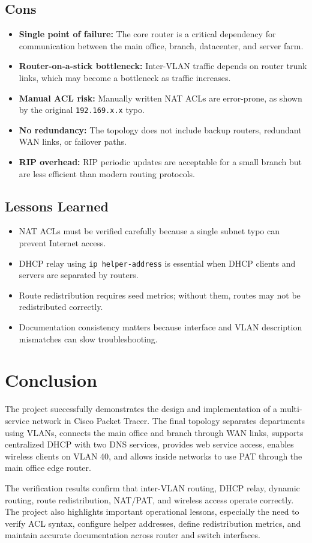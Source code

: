 \documentclass[12pt,a4paper]{article}
\begin{document}
\subsection*{Cons}
\begin{itemize}
    \item \textbf{Single point of failure:} The core router is a critical dependency for communication between the main office, branch, datacenter, and server farm.
    \item \textbf{Router-on-a-stick bottleneck:} Inter-VLAN traffic depends on router trunk links, which may become a bottleneck as traffic increases.
    \item \textbf{Manual ACL risk:} Manually written NAT ACLs are error-prone, as shown by the original \texttt{192.169.x.x} typo.
    \item \textbf{No redundancy:} The topology does not include backup routers, redundant WAN links, or failover paths.
    \item \textbf{RIP overhead:} RIP periodic updates are acceptable for a small branch but are less efficient than modern routing protocols.
\end{itemize}

\subsection*{Lessons Learned}
\begin{itemize}
    \item NAT ACLs must be verified carefully because a single subnet typo can prevent Internet access.
    \item DHCP relay using \texttt{ip helper-address} is essential when DHCP clients and servers are separated by routers.
    \item Route redistribution requires seed metrics; without them, routes may not be redistributed correctly.
    \item Documentation consistency matters because interface and VLAN description mismatches can slow troubleshooting.
\end{itemize}

\section{Conclusion}

The project successfully demonstrates the design and implementation of a multi-service network in Cisco Packet Tracer. The final topology separates departments using VLANs, connects the main office and branch through WAN links, supports centralized DHCP with two DNS services, provides web service access, enables wireless clients on VLAN 40, and allows inside networks to use PAT through the main office edge router.

The verification results confirm that inter-VLAN routing, DHCP relay, dynamic routing, route redistribution, NAT/PAT, and wireless access operate correctly. The project also highlights important operational lessons, especially the need to verify ACL syntax, configure helper addresses, define redistribution metrics, and maintain accurate documentation across router and switch interfaces.
\end{document}

